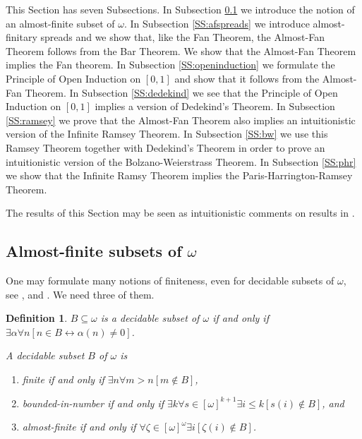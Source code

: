 \documentclass[a4paper]{amsart}
\theoremstyle{plain}
\newtheorem{definition}{Definition}
\begin{document}
This Section has seven Subsections. In Subsection \ref{SS:almostfinite} we introduce the notion of an almost-finite subset of $\omega$. In Subsection \ref{SS:afspreads} we introduce  almost-finitary spreads and we show that, like the Fan Theorem, the Almost-Fan Theorem follows from the Bar Theorem. We show that the Almost-Fan Theorem implies the Fan theorem. In Subsection \ref{SS:openinduction} we formulate the Principle of Open Induction on $[0,1]$ and show that it follows from the Almost-Fan Theorem. In Subsection \ref{SS:dedekind} we see that the Principle of Open Induction on $[0,1]$ implies a version of Dedekind's Theorem. In Subsection \ref{SS:ramsey} we prove that the Almost-Fan Theorem also implies an intuitionistic version of the Infinite Ramsey Theorem.  In Subsection \ref{SS:bw} we use this Ramsey Theorem together with Dedekind's Theorem in order to prove an intuitionistic version of the Bolzano-Weierstrass Theorem. In Subsection \ref{SS:phr} we show that the Infinite Ramsy Theorem implies the Paris-Harrington-Ramsey Theorem. 

\smallskip The  results of this Section may be seen as intuitionistic comments on results in \cite[Chapter III]{Simpson}.
\subsection{Almost-finite subsets of $\omega$}\label{SS:almostfinite} One may formulate many notions of finiteness, even for decidable subsets of $\omega$, see \cite{veldman1995}, \cite{veldman1999} and \cite[Section 3]{veldman2005}.  We need three of them. \begin{definition}\label{D:finite} $B\subseteq \omega$ is a  \emph{decidable subset of $\omega$} if and only if \\$\exists \alpha\forall n[n\in B\leftrightarrow \alpha(n)\neq 0]$.

A decidable subset $B$ of $\omega$ is \begin{enumerate} \item\emph{finite} if and only if $\exists n\forall  m>n[m\notin B]$,  \item \emph{bounded-in-number} if and only if $\exists k\forall s \in [\omega]^{k+1}\exists i\le k[s(i)\notin B]$, and \item \emph{almost-finite} if and only if $\forall \zeta \in [\omega]^\omega\exists i[\zeta(i)\notin B]$. \end{enumerate} \end{definition}
\end{document}
